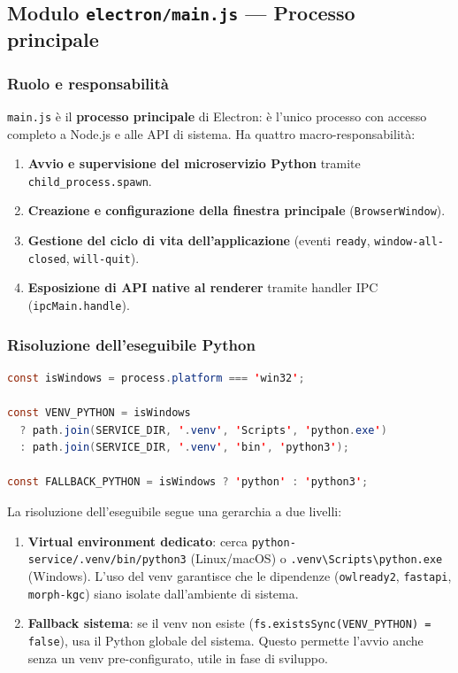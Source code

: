 \documentclass[a4paper,12pt]{article}
\begin{document}
\subsection{Modulo \texttt{electron/\allowbreak main.js} --- Processo principale}

\subsubsection{Ruolo e responsabilit\`{a}}

\texttt{main.js} \`{e} il \textbf{processo principale} di Electron:
\`{e} l'unico processo con accesso completo a Node.js e alle API di
sistema. Ha quattro macro-responsabilit\`{a}:

\begin{enumerate}
  \item \textbf{Avvio e supervisione del microservizio Python} tramite
        \texttt{child\_process.spawn}.
  \item \textbf{Creazione e configurazione della finestra principale}
        (\texttt{BrowserWindow}).
  \item \textbf{Gestione del ciclo di vita dell'applicazione} (eventi
        \texttt{ready}, \texttt{window-all-closed}, \texttt{will-quit}).
  \item \textbf{Esposizione di API native al renderer} tramite handler
        IPC (\texttt{ipcMain.handle}).
\end{enumerate}

\subsubsection{Risoluzione dell'eseguibile Python}
\vspace{2pt}
\begin{lstlisting}[language=Java, caption={Risoluzione cross-platform dell'eseguibile Python.}]
const isWindows = process.platform === 'win32';

const VENV_PYTHON = isWindows
  ? path.join(SERVICE_DIR, '.venv', 'Scripts', 'python.exe')
  : path.join(SERVICE_DIR, '.venv', 'bin', 'python3');

const FALLBACK_PYTHON = isWindows ? 'python' : 'python3';
\end{lstlisting}

\noindent La risoluzione dell'eseguibile segue una gerarchia a due livelli:
\begin{enumerate}[noitemsep]
  \item \textbf{Virtual environment dedicato}: cerca
        \texttt{python-service/.venv/bin/python3} (Linux/macOS) o
        \texttt{.venv\textbackslash Scripts\textbackslash python.exe}
        (Windows). L'uso del venv garantisce che le dipendenze
        (\texttt{owlready2}, \texttt{fastapi}, \texttt{morph-kgc})
        siano isolate dall'ambiente di sistema.
  \item \textbf{Fallback sistema}: se il venv non esiste
        (\texttt{fs.existsSync(VENV\_\allowbreak{}PYTHON) = false}), usa il Python
        globale del sistema. Questo permette l'avvio anche senza
        un venv pre-configurato, utile in fase di sviluppo.
\end{enumerate}
\end{document}
